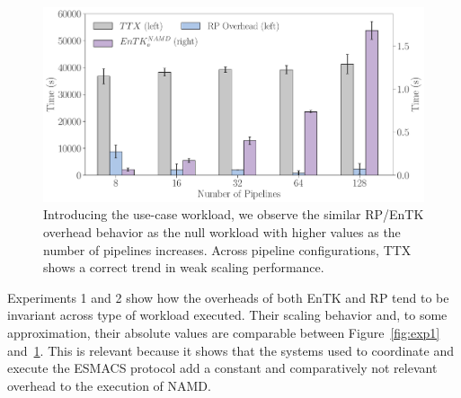 \begin{figure}
  \centering
  \includegraphics[width=\columnwidth]{FIGURES/namd_workload_overheads.pdf}
  \caption{Introducing the use-case workload, we observe the similar RP/EnTK overhead behavior as the null workload with higher values as the number of pipelines increases. Across pipeline configurations, TTX shows a correct trend in weak scaling performance.}\label{fig:exp2}
\end{figure}


Experiments 1 and 2 show how the overheads of both EnTK and RP tend to be
invariant across type of workload executed. Their scaling behavior and, to
some approximation, their absolute values are comparable between
Figure~\ref{fig:exp1} and~\ref{fig:exp2}. This is relevant because it shows
that the systems used to coordinate and execute the ESMACS protocol add a
constant and comparatively not relevant overhead to the execution of NAMD\@.




